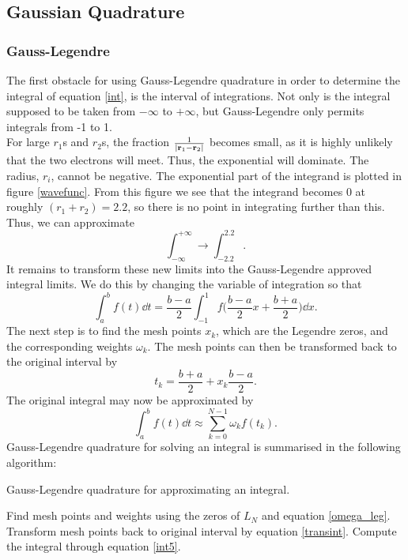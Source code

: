 \documentclass[notitlepage, reprint, nofootinbib]{revtex4-1}
\begin{document}
\subsection{Gaussian Quadrature}
\subsubsection{Gauss-Legendre}\label{GLeg}
The first obstacle for using Gauss-Legendre quadrature in order to determine the integral of equation \ref{int}, is the interval of integrations. Not only is the integral supposed to be taken from $-\infty$ to $+\infty$, but Gauss-Legendre only permits integrals from -1 to 1.\\[2mm]
For large $r_1$s and $r_2$s, the fraction $\frac{1}{|\vb{r}_1-\vb{r}_2|}$ becomes small, as it is highly unlikely that the two electrons will meet. Thus, the exponential will dominate. The radius, $r_i$, cannot be negative. The exponential part of the integrand is plotted in figure \ref{wavefunc}. From this figure we see that the integrand becomes 0 at roughly $(r_1+r_2)=2.2$, so there is no point in integrating further than this. Thus, we can approximate 
$$\int_{-\infty}^{+\infty}\rightarrow \int_{-2.2}^{2.2}.$$
It remains to transform these new limits into the Gauss-Legendre approved integral limits. We do this by changing the variable of integration so that
$$\int_a^b f(t)\dd t= \frac{b-a}{2}\int_{-1}^1 f\big(\frac{b-a}{2}x+\frac{b+a}{2}\big)\dd x.$$
The next step is to find the mesh points $x_k$, which are the Legendre zeros, and the corresponding weights $\omega_k$. The mesh points can then be transformed back to the original interval by 
\begin{equation}\label{transint}t_k=\frac{b+a}{2}+x_k\frac{b-a}{2}.\end{equation}
The original integral may now be approximated by 
\begin{equation}\label{int5}\int_a^bf(t)\dd t \approx \sum_{k=0}^{N-1}\omega_k f(t_k).\end{equation}
Gauss-Legendre quadrature for solving an integral is summarised in the following algorithm:
\begin{algorithm}[H]
	\caption{Gauss-Legendre quadrature for approximating an integral.}
	\begin{algorithmic}[1]
		\State Find mesh points and weights using the zeros of $L_N$ and equation \ref{omega_leg}. 
		\State Transform mesh points back to original interval by equation \ref{transint}. 
		\State Compute the integral through equation \ref{int5}.
	\end{algorithmic}
\end{algorithm}
\end{document}
